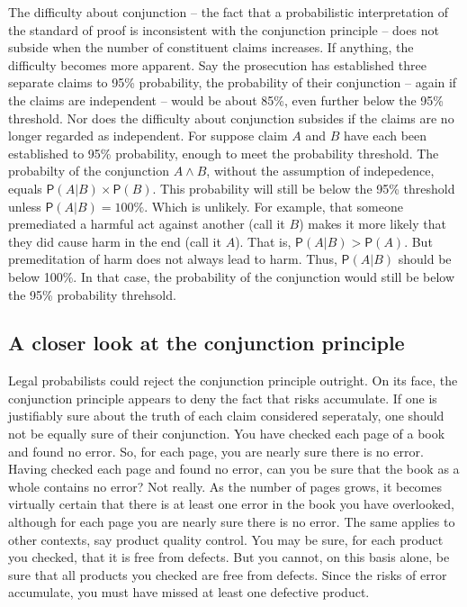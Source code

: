 \documentclass[10pt,dvipsnames,enabledeprecatedfontcommands]{scrartcl}
\newcommand{\et}{\wedge}
\newcommand{\pr}[1]{\mathsf{P}(#1)}
\begin{document}
The difficulty about conjunction -- the fact that a probabilistic
interpretation of the standard of proof is inconsistent with the
conjunction principle -- does not subside when the number of constituent
claims increases. If anything, the difficulty becomes more apparent. Say
the prosecution has established three separate claims to 95\%
probability, the probability of their conjunction -- again if the claims
are independent -- would be about 85\%, even further below the 95\%
threshold. Nor does the difficulty about conjunction subsides if the
claims are no longer regarded as independent. For suppose claim \(A\)
and \(B\) have each been established to 95\% probability, enough to meet
the probability threshold. The probabilty of the conjunction
\(A \et B\), without the assumption of indepedence, equals
\(\pr{A | B} \times \pr{B}\). This probability will still be below the
95\% threshold unless \(\pr{A | B}=100\%\). Which is unlikely. For
example, that someone premediated a harmful act against another (call it
\(B\)) makes it more likely that they did cause harm in the end (call it
\(A\)). That is, \(\pr{A | B} > \pr{A}\). But premeditation of harm does
not always lead to harm. Thus, \(\pr{A | B}\) should be below 100\%. In
that case, the probability of the conjunction would still be below the
95\% probability threhsold.

\hypertarget{a-closer-look-at-the-conjunction-principle}{%
\subsection{A closer look at the conjunction
principle}\label{a-closer-look-at-the-conjunction-principle}}

Legal probabilists could reject the conjunction principle outright. On
its face, the conjunction principle appears to deny the fact that risks
accumulate. If one is justifiably sure about the truth of each claim
considered seperataly, one should not be equally sure of their
conjunction. You have checked each page of a book and found no error.
So, for each page, you are nearly sure there is no error. Having checked
each page and found no error, can you be sure that the book as a whole
contains no error? Not really. As the number of pages grows, it becomes
virtually certain that there is at least one error in the book you have
overlooked, although for each page you are nearly sure there is no
error. The same applies to other contexts, say product quality control.
You may be sure, for each product you checked, that it is free from
defects. But you cannot, on this basis alone, be sure that all products
you checked are free from defects. Since the risks of error accumulate,
you must have missed at least one defective product.
\end{document}
